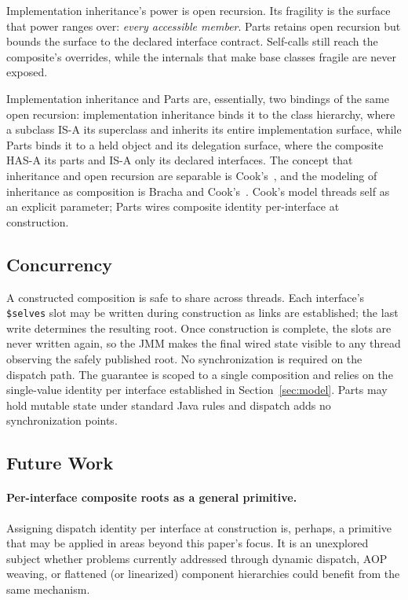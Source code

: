 \documentclass[acmsmall,screen,review,anonymous]{acmart}
\theoremstyle{acmplain}
\newcommand{\code}[1]{\texttt{#1}}
\begin{document}
Implementation inheritance's power is open recursion. Its fragility is the surface that power ranges over: \emph{every accessible
member}. Parts retains open recursion but bounds the surface to the declared interface contract. Self-calls still reach the
composite's overrides, while the internals that make base classes fragile are never exposed.

Implementation inheritance and Parts are, essentially, two bindings of the same open recursion: implementation inheritance
binds it to the class hierarchy, where a subclass IS-A its superclass and inherits its entire implementation surface, while
Parts binds it to a held object and its delegation surface, where the composite HAS-A its parts and IS-A only its declared interfaces.
The concept that inheritance and open recursion are separable is Cook's~\cite{cookpalsberg1989,cook1990}, and the modeling
of inheritance as composition is Bracha and Cook's~\cite{bracha1990}. Cook's model threads self as an explicit parameter;
Parts wires composite identity per-interface at construction.

\subsection{Concurrency}

A constructed composition is safe to share across threads. Each interface's \code{\$selves} slot may be written during construction
as links are established; the last write determines the resulting root. Once construction is complete, the slots are never
written again, so the JMM makes the final wired state visible to any thread observing the safely published root. No synchronization
is required on the dispatch path. The guarantee is scoped to a single composition and relies on the single-value identity
per interface established in Section~\ref{sec:model}. Parts may hold mutable state under standard Java rules and dispatch
adds no synchronization points.

\subsection{Future Work}
\label{sec:futurework}

\paragraph{Per-interface composite roots as a general primitive.}
Assigning dispatch identity per interface at construction is, perhaps, a primitive that may be applied in areas beyond this
paper's focus. It is an unexplored subject whether problems currently addressed through dynamic dispatch, AOP weaving, or
flattened (or linearized) component hierarchies could benefit from the same mechanism.
\end{document}
